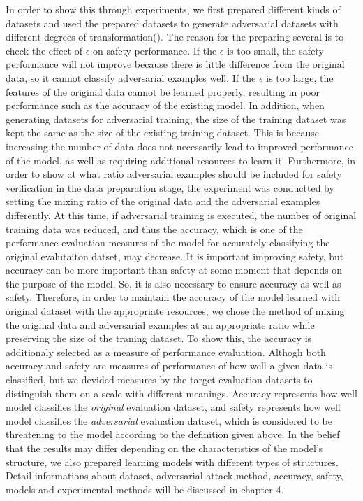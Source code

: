 \documentclass[journal,article,submit,moreauthors,pdftex]{Definitions/mdpi}
\begin{document}
In order to show this through experiments, we first prepared different kinds of datasets and used the prepared datasets to generate adversarial datasets with different degrees of transformation{\left({\epsilon}\right)}.
The reason for the preparing several {\epsilon} is to check the effect of {\({\epsilon}\)} on safety performance. If the {\({\epsilon}\)} is too small, the safety performance will not improve because there is little difference from the original data, so it cannot classify adversarial examples well. If the {\({\epsilon}\)} is too large, the features of the original data cannot be learned properly, resulting in poor performance such as the accuracy of the existing model.
In addition, when generating datasets for adversarial training, the size of the training dataset was kept the same as the size of the existing training dataset.
This is because increasing the number of data does not necessarily lead to improved performance of the model, as well as requiring additional resources to learn it.
Furthermore, in order to show at what ratio adversarial examples should be included for safety verification in the data preparation stage, the experiment was conductted by setting the mixing ratio of the original data and the adversarial examples differently.
At this time, if adversarial training is executed, the number of original training data was reduced, and thus the accuracy, which is one of the performance evaluation measures of the model for accurately classifying the original evalutaiton datset, may decrease.
It is important improving safety, but accuracy can be more important than safety at some moment that depends on the purpose of the model. So, it is also necessary to ensure accuracy as well as safety. 
Therefore, in order to maintain the accuracy of the model learned with original dataset with the appropriate resources, we chose the method of mixing the original data and adversarial examples at an appropriate ratio while preserving the size of the traning dataset.
To show this, the accuracy is additionaly selected as a measure of performance evaluation.
Althogh both accuracy and safety are measures of performance of how well a given data is classified, but we devided measures by the target evaluation datasets to distinguish them on a scale with different meanings.
Accuracy represents how well model classifies the {\it original} evaluation dataset, and safety represents how well model classifies the {\it adversarial} evaluation dataset, which is considered to be threatening to the model according to the definition given above.
In the belief that the results may differ depending on the characteristics of the model's structure, we also prepared learning models with different types of structures. 
Detail informations about dataset, adversarial attack method, accuracy, safety, models and experimental methods will be discussed in chapter 4.
\end{document}
